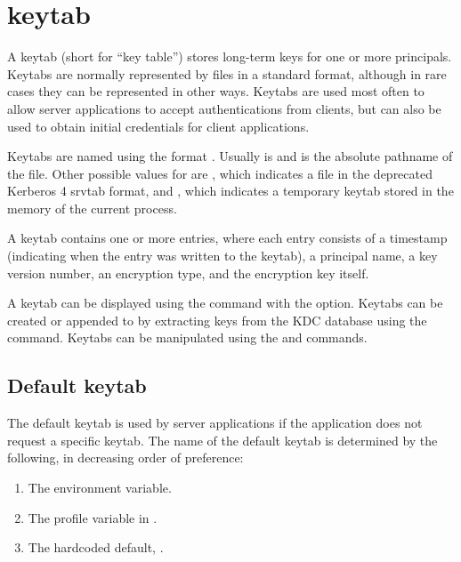 \documentclass[letterpaper,10pt,english]{sphinxmanual}
\begin{document}
\chapter{keytab}
\label{\detokenize{basic/keytab_def:keytab}}\label{\detokenize{basic/keytab_def::doc}}\label{\detokenize{basic/keytab_def:keytab-definition}}
A keytab (short for “key table”) stores long-term keys for one or more
principals.  Keytabs are normally represented by files in a standard
format, although in rare cases they can be represented in other ways.
Keytabs are used most often to allow server applications to accept
authentications from clients, but can also be used to obtain initial
credentials for client applications.

Keytabs are named using the format \sphinxcode{:}.  Usually
 is  and  is the absolute pathname of the file.
Other possible values for  are , which indicates a
file in the deprecated Kerberos 4 srvtab format, and , which
indicates a temporary keytab stored in the memory of the current
process.

A keytab contains one or more entries, where each entry consists of a
timestamp (indicating when the entry was written to the keytab), a
principal name, a key version number, an encryption type, and the
encryption key itself.

A keytab can be displayed using the  command with the
 option.  Keytabs can be created or appended to by extracting
keys from the KDC database using the  
command.  Keytabs can be manipulated using the  and
 commands.


\section{Default keytab}
\label{\detokenize{basic/keytab_def:default-keytab}}
The default keytab is used by server applications if the application
does not request a specific keytab.  The name of the default keytab is
determined by the following, in decreasing order of preference:
\begin{enumerate}
\item {} 
The  environment variable.

\item {} 
The  profile variable in .

\item {} 
The hardcoded default, .

\end{enumerate}
\end{document}
